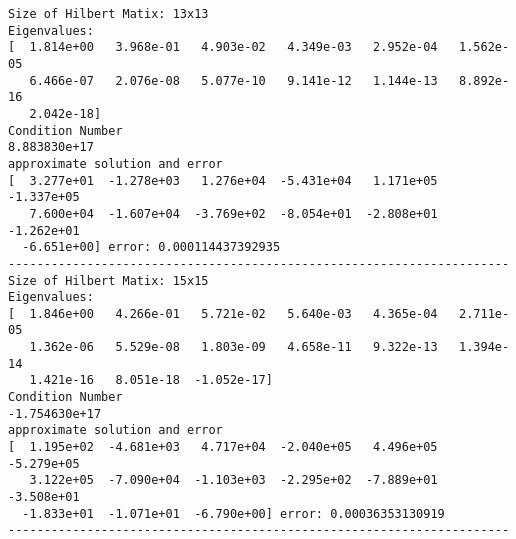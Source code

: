 \documentclass[letterpaper, 10pt, oneside]{article}
\begin{document}
\begin{lstlisting}
Size of Hilbert Matix: 13x13
Eigenvalues:
[  1.814e+00   3.968e-01   4.903e-02   4.349e-03   2.952e-04   1.562e-05
   6.466e-07   2.076e-08   5.077e-10   9.141e-12   1.144e-13   8.892e-16
   2.042e-18]
Condition Number
8.883830e+17
approximate solution and error
[  3.277e+01  -1.278e+03   1.276e+04  -5.431e+04   1.171e+05  -1.337e+05
   7.600e+04  -1.607e+04  -3.769e+02  -8.054e+01  -2.808e+01  -1.262e+01
  -6.651e+00] error: 0.000114437392935
----------------------------------------------------------------------
Size of Hilbert Matix: 15x15
Eigenvalues:
[  1.846e+00   4.266e-01   5.721e-02   5.640e-03   4.365e-04   2.711e-05
   1.362e-06   5.529e-08   1.803e-09   4.658e-11   9.322e-13   1.394e-14
   1.421e-16   8.051e-18  -1.052e-17]
Condition Number
-1.754630e+17
approximate solution and error
[  1.195e+02  -4.681e+03   4.717e+04  -2.040e+05   4.496e+05  -5.279e+05
   3.122e+05  -7.090e+04  -1.103e+03  -2.295e+02  -7.889e+01  -3.508e+01
  -1.833e+01  -1.071e+01  -6.790e+00] error: 0.00036353130919
----------------------------------------------------------------------
\end{lstlisting}
\end{document}
